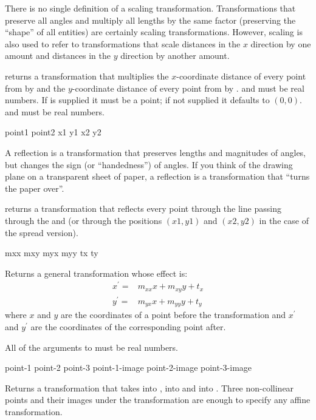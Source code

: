 There is no single definition of a scaling transformation.  Transformations that
preserve all angles and multiply all lengths by the same factor (preserving the
``shape'' of all entities) are certainly scaling transformations.  However,
scaling is also used to refer to transformations that scale distances in the $x$
direction by one amount and distances in the $y$ direction by another amount.

 returns a transformation that multiplies the
$x$-coordinate distance of every point from  by  and
the $y$-coordinate distance of every point from  by .
 and  must be real numbers.  If  is
supplied it must be a point; if not supplied it defaults to $(0,0)$.
 and  must be real numbers.


  {point1 point2}
 {x1 y1 x2 y2}

A reflection is a transformation that preserves lengths and magnitudes of
angles, but changes the sign (or ``handedness'') of angles.  If you think of the
drawing plane on a transparent sheet of paper, a reflection is a transformation
that ``turns the paper over''.

 returns a transformation that reflects every
point through the line passing through the   and
 (or through the positions $(x1,y1)$ and $(x2,y2)$ in the case of
the spread version).


 {mxx mxy myx myy tx ty}

Returns a general transformation whose effect is:
\begin{eqnarray*}
  x^\prime =& m_{xx} x + m_{xy} y + t_x \\
  y^\prime =& m_{yx} x + m_{yy} y + t_y
\end{eqnarray*}
where $x$ and $y$ are the coordinates of a point before the transformation and
$x^\prime$ and $y^\prime$ are the coordinates of the corresponding point after.

All of the arguments to  must be real numbers.


 {point-1 point-2 point-3 point-1-image point-2-image point-3-image}

Returns a transformation that takes   into
,  into  and 
into .  Three non-collinear points and their images under the
transformation are enough to specify any affine transformation.

